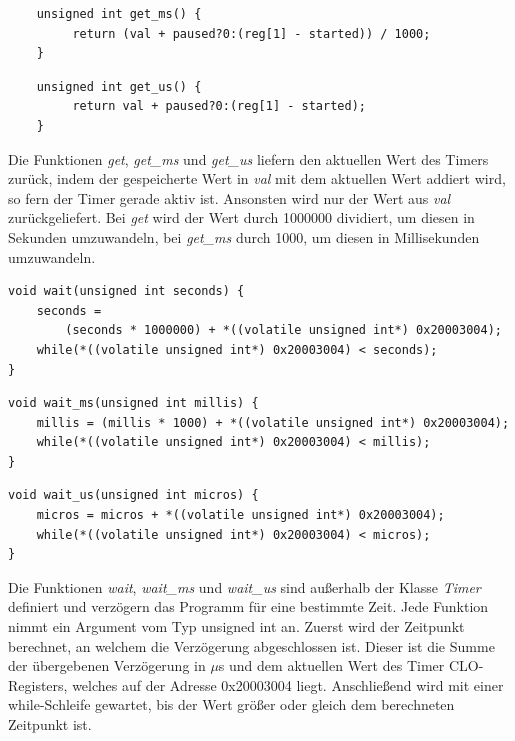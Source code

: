 \documentclass[12pt]{article}
\begin{document}
\begin{verbatim}
    unsigned int get_ms() {
         return (val + paused?0:(reg[1] - started)) / 1000;
    }
\end{verbatim}
\begin{verbatim}
    unsigned int get_us() {
         return val + paused?0:(reg[1] - started);
    }
\end{verbatim}
\vspace{-2mm}
Die Funktionen \textit{get}, \textit{get\_ms} und \textit{get\_us} liefern den aktuellen Wert des Timers zurück, indem der gespeicherte Wert in \textit{val} mit dem aktuellen Wert addiert wird, so fern der Timer gerade aktiv ist. Ansonsten wird nur der Wert aus \textit{val} zurückgeliefert. Bei \textit{get} wird der Wert durch 1000000 dividiert, um diesen in Sekunden umzuwandeln, bei \textit{get\_ms} durch 1000, um diesen in Millisekunden umzuwandeln.\\
\begin{verbatim}
void wait(unsigned int seconds) {
    seconds = 
        (seconds * 1000000) + *((volatile unsigned int*) 0x20003004);
    while(*((volatile unsigned int*) 0x20003004) < seconds);
}
\end{verbatim}
\begin{verbatim}
void wait_ms(unsigned int millis) {
    millis = (millis * 1000) + *((volatile unsigned int*) 0x20003004);
    while(*((volatile unsigned int*) 0x20003004) < millis);
}
\end{verbatim}
\begin{verbatim}
void wait_us(unsigned int micros) {
    micros = micros + *((volatile unsigned int*) 0x20003004);
    while(*((volatile unsigned int*) 0x20003004) < micros);
}
\end{verbatim}
\vspace{-2mm}
Die Funktionen \textit{wait}, \textit{wait\_ms} und \textit{wait\_us} sind außerhalb der Klasse \textit{Timer} definiert und verzögern das Programm für eine bestimmte Zeit. Jede Funktion nimmt ein Argument vom Typ unsigned int an. Zuerst wird der Zeitpunkt berechnet, an welchem die Verzögerung abgeschlossen ist. Dieser ist die Summe der übergebenen Verzögerung in $\mu$s und dem aktuellen Wert des Timer CLO-Registers, welches auf der Adresse 0x20003004 liegt. Anschließend wird mit einer while-Schleife gewartet, bis der Wert größer oder gleich dem berechneten Zeitpunkt ist.
\end{document}

